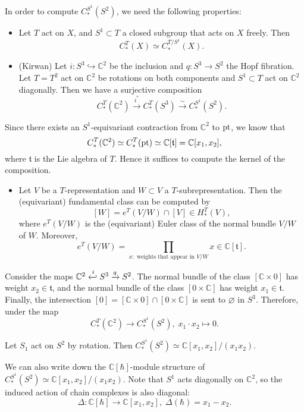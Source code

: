 In order to compute $C_*^{S^1}(S^2)$, we need the following properties:
\begin{itemize}
    \item Let $T$ act on $X$, and $S^1 \subset T$ a closed subgroup that acts on $X$ freely. Then
    $$C_*^T(X) \simeq C_*^{T/S^1}(X).$$
    \item (Kirwan) Let $i: S^3 \hookrightarrow \mathbb{C}^2$ be the inclusion and $q: S^3 \rightarrow S^2$ the Hopf fibration. Let $T = T^2$ act on $\mathbb{C}^2$ be rotations on both components and $S^1 \subset T$ act on $\mathbb{C}^2$ diagonally. Then we have a surjective composition
    $$C_*^{T}(\mathbb{C}^2) \xrightarrow{i^*} C_*^{T}(S^3) \xrightarrow{\sim} C_*^{S^1}(S^2).$$
\end{itemize}
Since there exists an $S^1$-equivariant contraction from $\mathbb{C}^2$ to $\mathrm{pt}$, we know that
$$C_*^{T}(\mathbb{C}^2) \simeq C_*^{T}(\mathrm{pt}) \simeq \mathbb{C}[\mathfrak{t}] = \mathbb{C}[x_1, x_2],$$
where $\mathfrak{t}$ is the Lie algebra of $T$. Hence it suffices to compute the kernel of the composition.
\begin{itemize}
    \item Let $V$ be a $T$-representation and $W \subset V$ a $T$-subrepresentation. Then the (equivariant) fundamental class can be computed by
    $$[W] = e^T(V/W) \cap [V] \in H_*^{T}(V),$$
    where $e^T(V/W)$ is the (equivariant) Euler class of the normal bundle $V/W$ of $W$. Moreover,
    $$e^T(V/W) = \prod_{x: \text{ weights that appear in $V/W$}}x \in \mathbb{C}[\mathfrak{t}].$$
\end{itemize}
Consider the maps $\mathbb{C}^2 \xhookleftarrow{i} S^3 \xrightarrow{q} S^2$. The normal bundle of the class $[\mathbb{C} \times 0]$ has weight $x_2 \in \mathfrak{t}$, and the normal bundle of the class $[0 \times \mathbb{C}]$ has weight $x_1 \in \mathfrak{t}$. Finally, the intersection $[0] = [\mathbb{C} \times 0] \cap [0 \times \mathbb{C}]$ is sent to $\varnothing$ in $S^3$. Therefore, under the map
$$C_*^{T}(\mathbb{C}^2) \rightarrow C_*^{S^1}(S^2), \; x_1 \cdot x_2 \mapsto 0.$$

\begin{Lemma}
    Let $S_1$ act on $S^2$ by rotation. Then $C_*^{S^1}(S^2) \simeq \mathbb{C}[x_1, x_2]/(x_1 x_2)$.
\end{Lemma}

We can also write down the $\mathbb{C}[\hbar]$-module structure of $C_*^{S^1}(S^2) \simeq \mathbb{C}[x_1, x_2]/(x_1 x_2)$. Note that $S^1$ acts diagonally on $\mathbb{C}^2$, so the induced action of chain complexes is also diagonal:
$$\Delta: \mathbb{C}[\hbar] \rightarrow \mathbb{C}[x_1, x_2], \; \Delta(\hbar) = x_1 - x_2.$$

